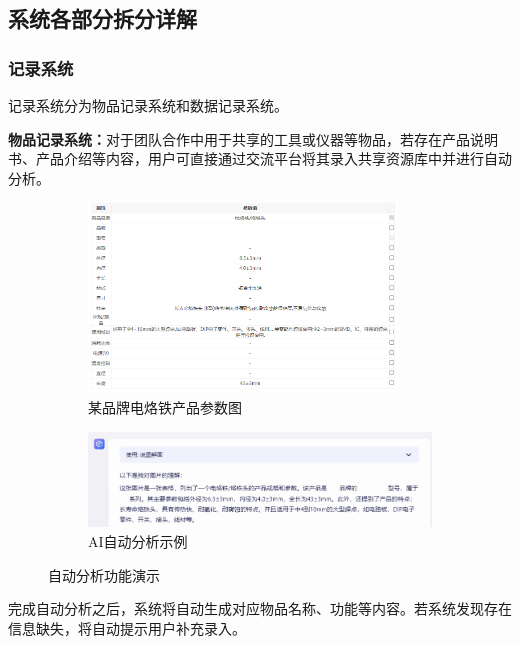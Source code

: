 \documentclass[zihao=-4]{ctexart}
\begin{document}
\begin{spacing}{1.5}
\subsection{系统各部分拆分详解}
 \subsubsection{记录系统}记录系统分为物品记录系统和数据记录系统。

\textbf{物品记录系统：}对于团队合作中用于共享的工具或仪器等物品，若存在产品说明书、产品介绍等内容，用户可直接通过交流平台将其录入共享资源库中并进行自动分析。
\begin{figure}[H]
	\centering
	\begin{subfigure}{0.8\textwidth}
		\centering
		\includegraphics[width=0.9\textwidth]{电烙铁.png}
		\caption{某品牌电烙铁产品参数图}
		\label{chutian1}%
	\end{subfigure}
	\qquad
	\begin{subfigure}{0.8\linewidth}
		\centering
		\includegraphics[width=0.9\linewidth]{文心一言.png}
		\caption{AI自动分析示例}
		\label{chutian2}%
	\end{subfigure}
\caption{自动分析功能演示}
\label{qmix-train}
\end{figure}
完成自动分析之后，系统将自动生成对应物品名称、功能等内容。若系统发现存在信息缺失，将自动提示用户补充录入。
\begin{figure}[H] %

\end{figure}
\end{spacing}
\end{document}
